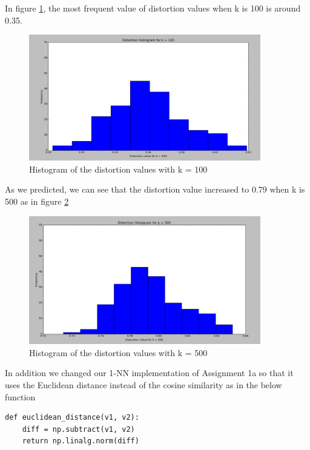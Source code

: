 In figure \ref{k100}, the most frequent value of distortion values when k is 100 is around 0.35.

\begin{figure}[!htb]
\centering
\includegraphics[width=0.9\textwidth]{shots/k100.png}
\caption{Histogram of the distortion values with k = 100 }
\label{k100}
\end{figure}

As we predicted, we can see that the distortion value increased to 0.79 when k is 500 as in figure \ref{k500}

\begin{figure}[!htb]
\centering
\includegraphics[width=0.9\textwidth]{shots/k500.png}
\caption{Histogram of the distortion values with k = 500 }
\label{k500}
\end{figure} 

In addition we changed our 1-NN implementation of Assignment 1a so that it uses the Euclidean distance instead of the cosine similarity as in the below function 

\begin{lstlisting}[frame=single]
def euclidean_distance(v1, v2):
    diff = np.subtract(v1, v2)
    return np.linalg.norm(diff)
\end{lstlisting}


